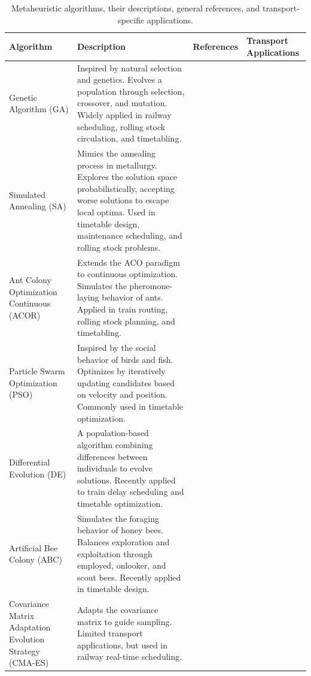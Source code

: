 \documentclass[Afour,sagev,times]{sagej}
\begin{document}
\begin{table}[ht]
\centering
\scriptsize
\caption{Metaheuristic algorithms, their descriptions, general references, and transport-specific applications.}
\begin{tabular}{|>{\centering\arraybackslash}p{2.5cm}|p{7.5cm}|>{\centering\arraybackslash}p{2cm}|>{\centering\arraybackslash}p{2cm}|}
\hline
\textbf{Algorithm} & \textbf{Description} & \textbf{References} & \textbf{Transport Applications} \\ \hline \hline
Genetic Algorithm (GA) & Inspired by natural selection and genetics. Evolves a population through selection, crossover, and mutation. Widely applied in railway scheduling, rolling stock circulation, and timetabling. & \cite{Holland75} & \cite{Canca18, Pan20, Han21} \\ \hline
Simulated Annealing (SA) & Mimics the annealing process in metallurgy. Explores the solution space probabilistically, accepting worse solutions to escape local optima. Used in timetable design, maintenance scheduling, and rolling stock problems. & \cite{Cerny85, Kirkpatrick85} & \cite{Yue17, Robenek18, Lin19} \\ \hline
Ant Colony Optimization Continuous (ACOR) & Extends the ACO paradigm to continuous optimization. Simulates the pheromone-laying behavior of ants. Applied in train routing, rolling stock planning, and timetabling. & \cite{Dorigo92} & \cite{Tsuji12, Sama16, Coviello23} \\ \hline
Particle Swarm Optimization (PSO) & Inspired by the social behavior of birds and fish. Optimizes by iteratively updating candidates based on velocity and position. Commonly used in timetable optimization. & \cite{Eberhart95} & \cite{Ho12, Jamili12, Wu16} \\ \hline
Differential Evolution (DE) & A population-based algorithm combining differences between individuals to evolve solutions. Recently applied to train delay scheduling and timetable optimization. & \cite{Storn95, Storn97} & \cite{Zhong13, Song23} \\ \hline
Artificial Bee Colony (ABC) & Simulates the foraging behavior of honey bees. Balances exploration and exploitation through employed, onlooker, and scout bees. Recently applied in timetable design. & \cite{Karaboga05, Karaboga07} & \cite{Chen22, Wang24} \\ \hline
Covariance Matrix Adaptation Evolution Strategy (CMA-ES) & Adapts the covariance matrix to guide sampling. Limited transport applications, but used in railway real-time scheduling. & \cite{Auger11} & \cite{Prasad20} \\ \hline

\end{tabular}
\end{table}
\end{document}
